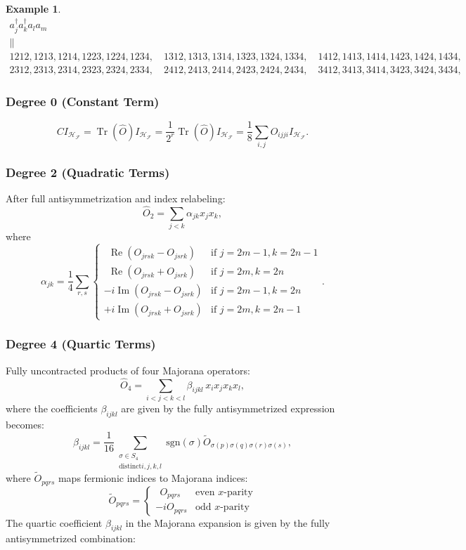 \documentclass[aps,preprint]{revtex4}%
\newtheorem{example}[theorem]{Example}
\begin{document}
\begin{example}%
\begin{gather}
a_{j}^{\dagger}a_{k}^{\dagger}a_{l}a_{m}\\
\parallel\\
1212,1213,1214,1223,1224,1234,\quad1312,1313,1314,1323,1324,1334,\quad
1412,1413,1414,1423,1424,1434,\\
2312,2313,2314,2323,2324,2334,\quad2412,2413,2414,2423,2424,2434,\quad
3412,3413,3414,3423,3424,3434,
\end{gather}

\end{example}

\subsubsection*{Degree 0 (Constant Term)}%

\[
CI_{\mathcal{H}_{\mathcal{F}}}=\operatorname*{Tr}(\hat{O})I_{\mathcal{H}%
_{\mathcal{F}}}=\frac{1}{2^{r}}\operatorname*{Tr}(\hat{O})I_{\mathcal{H}%
_{\mathcal{F}}}=\frac{1}{8}\sum_{i,j}O_{ijji}I_{\mathcal{H}_{\mathcal{F}}}.
\]


\subsubsection*{Degree 2 (Quadratic Terms)}

After full antisymmetrization and index relabeling:
\begin{equation}
\hat{O}_{2}=\sum_{j<k}\alpha_{jk}x_{j}x_{k},
\end{equation}
where
\[
\alpha_{jk}=\frac{1}{4}\sum_{r,s}%
\begin{cases}
\;\,\operatorname*{Re}(O_{jrsk}-O_{jsrk}) & \text{if }j=2m-1,k=2n-1\\
\;\,\operatorname*{Re}(O_{jrsk}+O_{jsrk}) & \text{if }j=2m,k=2n\\
-i\operatorname*{Im}(O_{jrsk}-O_{jsrk}) & \text{if }j=2m-1,k=2n\\
+i\operatorname*{Im}(O_{jrsk}+O_{jsrk}) & \text{if }j=2m,k=2n-1
\end{cases}
.
\]


\subsubsection*{Degree 4 (Quartic Terms)}

Fully uncontracted products of four Majorana operators:
\[
\hat{O}_{4}=\sum_{i<j<k<l}\beta_{ijkl}\,x_{i}x_{j}x_{k}x_{l},
\]
where the coefficients $\beta_{ijkl}$ are given by the fully antisymmetrized
expression becomes:
\[
\beta_{ijkl}=\frac{1}{16}\sum_{\substack{\sigma\in S_{4}\\\text{distinct
}i,j,k,l}}\text{sgn}(\sigma)\tilde{O}_{\sigma(p)\sigma(q)\sigma(r)\sigma(s)},
\]
where $\tilde{O}_{pqrs}$ maps fermionic indices to Majorana indices:
\[
\tilde{O}_{pqrs}=%
\begin{cases}
\;\,O_{pqrs} & \text{even }x\text{-parity}\\
-iO_{pqrs} & \text{odd }x\text{-parity}%
\end{cases}
\]
The quartic coefficient $\beta_{ijkl}$ in the Majorana expansion is given by
the fully antisymmetrized combination:%
\end{document}
